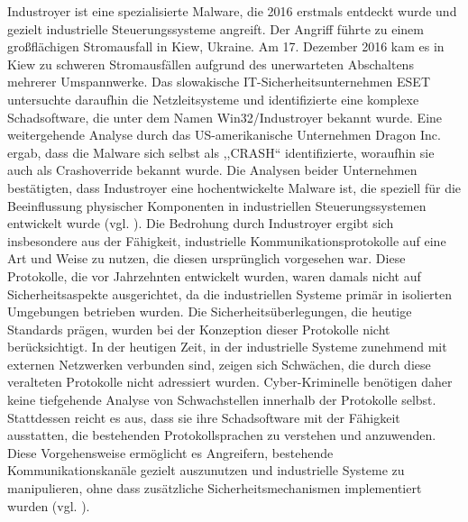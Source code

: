 Industroyer ist eine spezialisierte Malware, die 2016 erstmals entdeckt wurde und gezielt industrielle Steuerungssysteme angreift. Der Angriff führte zu einem großflächigen Stromausfall in Kiew, Ukraine. Am 17. Dezember 2016 kam es in Kiew zu schweren Stromausfällen aufgrund des unerwarteten Abschaltens mehrerer Umspannwerke. Das slowakische IT-Sicherheitsunternehmen ESET untersuchte daraufhin die Netzleitsysteme und identifizierte eine komplexe Schadsoftware, die unter dem Namen Win32/Industroyer bekannt wurde. Eine weitergehende Analyse durch das US-amerikanische Unternehmen Dragon Inc. ergab, dass die Malware sich selbst als ,,CRASH`` identifizierte, woraufhin sie auch als Crashoverride bekannt wurde. Die Analysen beider Unternehmen bestätigten, dass Industroyer eine hochentwickelte Malware ist, die speziell für die Beeinflussung physischer Komponenten in industriellen Steuerungssystemen entwickelt wurde (vgl. \cite{rhebo}). Die Bedrohung durch Industroyer ergibt sich insbesondere aus der Fähigkeit, industrielle Kommunikationsprotokolle auf eine Art und Weise zu nutzen, die diesen ursprünglich vorgesehen war. Diese Protokolle, die vor Jahrzehnten entwickelt wurden, waren damals nicht auf Sicherheitsaspekte ausgerichtet, da die industriellen Systeme primär in isolierten Umgebungen betrieben wurden. Die Sicherheitsüberlegungen, die heutige Standards prägen, wurden bei der Konzeption dieser Protokolle nicht berücksichtigt. In der heutigen Zeit, in der industrielle Systeme zunehmend mit externen Netzwerken verbunden sind, zeigen sich Schwächen, die durch diese veralteten Protokolle nicht adressiert wurden. Cyber-Kriminelle benötigen daher keine tiefgehende Analyse von Schwachstellen innerhalb der Protokolle selbst. Stattdessen reicht es aus, dass sie ihre Schadsoftware mit der Fähigkeit ausstatten, die bestehenden Protokollsprachen zu verstehen und anzuwenden. Diese Vorgehensweise ermöglicht es Angreifern, bestehende Kommunikationskanäle gezielt auszunutzen und industrielle Systeme zu manipulieren, ohne dass zusätzliche Sicherheitsmechanismen implementiert wurden (vgl. \cite{welivesecurity}).